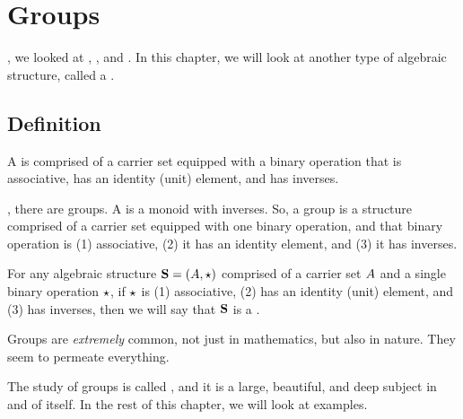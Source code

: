 \documentclass[../../../main.tex]{subfiles}
\begin{document}
\chapter{Groups}
\label{ch:groups}

, we looked at , , and . In this chapter, we will look at another type of algebraic structure, called a .


\section{Definition}

\begin{terminology}
  A  is comprised of a carrier set equipped with a binary operation that is associative, has an identity (unit) element, and has inverses.
\end{terminology}

, there are groups. A  is a monoid with inverses. So, a group is a structure comprised of a carrier set equipped with one binary operation, and that binary operation is (1) associative, (2) it has an identity element, and (3) it has inverses.

\begin{fdefinition}[Group]
  \label{def:group}
  For any algebraic structure $\algebra{S} = (\set{A}, \opSymbol/)$ comprised of a carrier set $A$ and a single binary operation $\opSymbol/$, if $\opSymbol/$ is (1) associative, (2) has an identity (unit) element, and (3) has inverses, then we will say that $\mathbf{S}$ is a .
\end{fdefinition}

\begin{aside}
  \begin{remark}
    Groups are \emph{extremely} common, not just in mathematics, but also in nature. They seem to permeate everything.
  \end{remark}
\end{aside}

The study of groups is called , and it is a large, beautiful, and deep subject in and of itself. In the rest of this chapter, we will look at examples.
\end{document}
